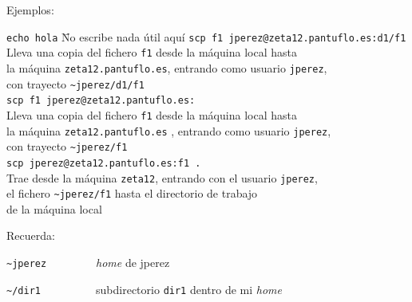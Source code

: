 \documentclass[ucs]{beamer}
\begin{document}
\begin{frame}[fragile]


   Ejemplos:
    \begin{footnotesize}
      \begin{tabbing}
        \verb|echo hola|\hspace{1cm} \= No escribe nada útil aquí\kill
        \verb|scp f1 jperez@zeta12.pantuflo.es:d1/f1|\\\> Lleva una 
copia del fichero \verb|f1| desde la máquina local hasta \\\> la máquina
        \verb|zeta12.pantuflo.es|, entrando como usuario \verb|jperez|,
        \\\> con trayecto \verb|~jperez/d1/f1| \\
        \verb|scp f1 jperez@zeta12.pantuflo.es:|\\\> Lleva una copia del fichero
        \verb|f1| desde la máquina local hasta \\\>la máquina
        \verb|zeta12.pantuflo.es| , entrando como usuario \verb|jperez|,
        \\\> con trayecto \verb|~jperez/f1|\\
        \verb|scp jperez@zeta12.pantuflo.es:f1 .|\\\> Trae desde la máquina 
\verb|zeta12|, entrando con el usuario \verb|jperez|,\\\> el fichero 
        \verb|~jperez/f1|  hasta el directorio  
de trabajo 
\\\>
de la máquina local \\\>
      \end{tabbing}

Recuerda:

\verb|~jperez        |  \emph{home} de jperez

\verb|~/dir1         |  subdirectorio \verb|dir1| dentro de mi \emph{home}
    \end{footnotesize}
\end{frame}
\end{document}
